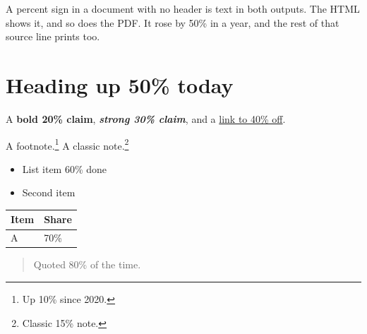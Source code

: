 A percent sign in a document with no header is text in both outputs. The
HTML shows it, and so does the PDF. It rose by 50\% in a year, and the
rest of that source line prints too.

\section{Heading up 50\% today}

A \textbf{bold 20\% claim}, \textbf{\emph{strong 30\% claim}}, and a \href{https://example.com/sale}{link to 40\% off}.

A footnote.\footnote{Up 10\% since 2020.} A classic note.\footnote{Classic 15\% note.}

\begin{itemize}
\item List item 60\% done
\item Second item
\end{itemize}

\begin{tabular}{ll}
\toprule
Item & Share \\
\midrule
A & 70\% \\
\bottomrule
\end{tabular}

\begin{quote}
Quoted 80\% of the time.
\end{quote}

